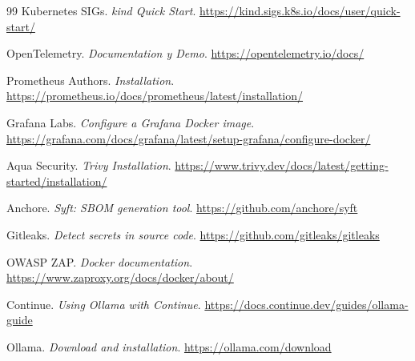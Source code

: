 \begin{thebibliography}{99}
Kubernetes SIGs.
\emph{kind Quick Start}.
\url{https://kind.sigs.k8s.io/docs/user/quick-start/}

OpenTelemetry.
\emph{Documentation y Demo}.
\url{https://opentelemetry.io/docs/}

Prometheus Authors.
\emph{Installation}.
\url{https://prometheus.io/docs/prometheus/latest/installation/}

Grafana Labs.
\emph{Configure a Grafana Docker image}.
\url{https://grafana.com/docs/grafana/latest/setup-grafana/configure-docker/}

Aqua Security.
\emph{Trivy Installation}.
\url{https://www.trivy.dev/docs/latest/getting-started/installation/}

Anchore.
\emph{Syft: SBOM generation tool}.
\url{https://github.com/anchore/syft}

Gitleaks.
\emph{Detect secrets in source code}.
\url{https://github.com/gitleaks/gitleaks}

OWASP ZAP.
\emph{Docker documentation}.
\url{https://www.zaproxy.org/docs/docker/about/}

Continue.
\emph{Using Ollama with Continue}.
\url{https://docs.continue.dev/guides/ollama-guide}

Ollama.
\emph{Download and installation}.
\url{https://ollama.com/download}

\end{thebibliography}
